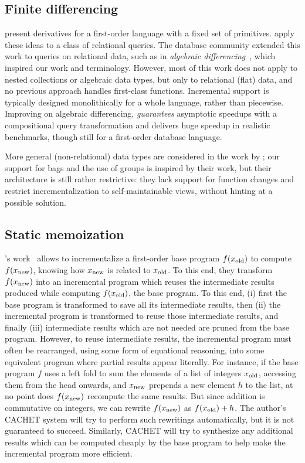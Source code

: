 \subsection{Finite differencing}
\label{sec:finite-diff}
\citet{Paige82FDC} present derivatives for a first-order language
with a fixed set of primitives.
\citet{Blakeley:1986:EUM} apply these ideas to a class of relational queries.
The database community extended
this work to queries on relational data, such as in \emph{algebraic
  differencing}~\citep{Gupta99MMV}, which inspired our work and
terminology. However, most of this work does not apply to nested
collections or algebraic data types, but only to relational
(flat) data, and no previous approach handles first-class
functions. Incremental support is typically designed
monolithically for a whole language, rather than piecewise.
Improving on algebraic differencing, \citet{Koch10IQE}
\emph{guarantees} asymptotic speedups with a compositional query
transformation and delivers huge speedup in realistic benchmarks,
though still for a first-order database language.

More general (non-relational) data types are considered in the work by \citet{GlucheGrust97Incr};
our support for bags and the use of groups is inspired by their work,
but their architecture is still rather restrictive: they lack
support for function changes and restrict incrementalization to
self-maintainable views, without hinting at a possible solution.


\subsection{Static memoization}
\label{ssec:staticmemo}
\citeauthor{Liu00}'s work~\citep{Liu00} allows to incrementalize a first-order base
program $f(x_{\textrm{old}})$ to compute $f(x_{\textrm{new}})$, knowing how
$x_{\textrm{new}}$ is related to $x_{\textrm{old}}$. To this end, they transform
$f(x_{\textrm{new}})$ into an incremental program which reuses the
intermediate results produced while computing $f(x_{\textrm{old}})$, the
base program. To this end, (i) first the base program is
transformed to save all its intermediate results, then (ii) the
incremental program is transformed to reuse those intermediate
results, and finally (iii) intermediate results which are not
needed are pruned from the base program. However, to reuse
intermediate results, the incremental program must often be
rearranged, using some form of equational reasoning, into some
equivalent program where partial results appear literally. For
instance, if the base program $f$ uses a left fold to sum the
elements of a list of integers $x_{\textrm{old}}$, accessing them from the
head onwards, and $x_{\textrm{new}}$ prepends a new element $h$ to the
list, at no point does $f(x_{\textrm{new}})$ recompute the same results.
But since addition is commutative on integers, we can rewrite
$f(x_{\textrm{new}})$ as $f(x_{\textrm{old}}) + h$. The author's CACHET system will
try to perform such rewritings automatically, but it is not
guaranteed to succeed. Similarly, CACHET will try to synthesize
any additional results which can be computed cheaply by the base
program to help make the incremental program more efficient.

